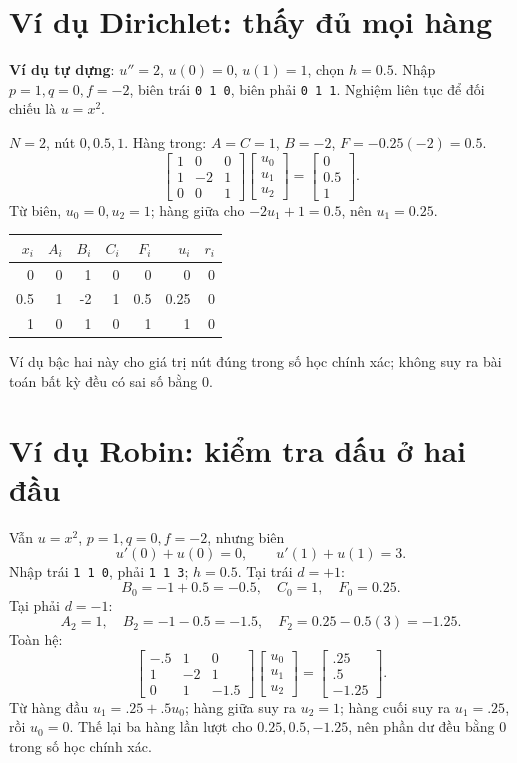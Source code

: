 \section{Ví dụ Dirichlet: thấy đủ mọi hàng}
\textbf{Ví dụ tự dựng}: $u''=2$, $u(0)=0$, $u(1)=1$, chọn $h=0.5$. Nhập $p=1,q=0,f=-2$, biên trái \texttt{0 1 0}, biên phải \texttt{0 1 1}. Nghiệm liên tục để đối chiếu là $u=x^2$.

$N=2$, nút $0,0.5,1$. Hàng trong: $A=C=1$, $B=-2$, $F=-0.25(-2)=0.5$.
\[
 \begin{bmatrix}1&0&0\\1&-2&1\\0&0&1\end{bmatrix}
 \begin{bmatrix}u_0\\u_1\\u_2\end{bmatrix}
 =\begin{bmatrix}0\\0.5\\1\end{bmatrix}.
\]
Từ biên, $u_0=0,u_2=1$; hàng giữa cho $-2u_1+1=0.5$, nên $u_1=0.25$.
\begin{center}\begin{tabular}{rrrrrrr}\toprule
$x_i$&$A_i$&$B_i$&$C_i$&$F_i$&$u_i$&$r_i$\\\midrule
0&0&1&0&0&0&0\\
0.5&1&-2&1&0.5&0.25&0\\
1&0&1&0&1&1&0\\\bottomrule
\end{tabular}\end{center}
Ví dụ bậc hai này cho giá trị nút đúng trong số học chính xác; không suy ra bài toán bất kỳ đều có sai số bằng 0.

\section{Ví dụ Robin: kiểm tra dấu ở hai đầu}
Vẫn $u=x^2$, $p=1,q=0,f=-2$, nhưng biên
\[
 u'(0)+u(0)=0,\qquad u'(1)+u(1)=3.
\]
Nhập trái \texttt{1 1 0}, phải \texttt{1 1 3}; $h=0.5$. Tại trái $d=+1$:
\[
 B_0=-1+0.5=-0.5,\quad C_0=1,\quad F_0=0.25.
\]
Tại phải $d=-1$:
\[
 A_2=1,\quad B_2=-1-0.5=-1.5,\quad F_2=0.25-0.5(3)=-1.25.
\]
Toàn hệ:
\[
 \begin{bmatrix}-.5&1&0\\1&-2&1\\0&1&-1.5\end{bmatrix}
 \begin{bmatrix}u_0\\u_1\\u_2\end{bmatrix}
 =\begin{bmatrix}.25\\.5\\-1.25\end{bmatrix}.
\]
Từ hàng đầu $u_1=.25+.5u_0$; hàng giữa suy ra $u_2=1$; hàng cuối suy ra $u_1=.25$, rồi $u_0=0$. Thế lại ba hàng lần lượt cho $0.25,0.5,-1.25$, nên phần dư đều bằng 0 trong số học chính xác.

